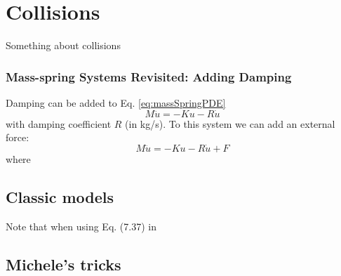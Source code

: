 \chapter{Collisions}\label{ch:collisions}
Something about collisions

\subsection{Mass-spring Systems Revisited: Adding Damping}

Damping can be added to Eq. \eqref{eq:massSpringPDE}  
\begin{equation}
    M\ddot u = -Ku - R\dot u
\end{equation}
with damping coefficient $R$ (in kg/s). To this system we can add an external force:
\begin{equation}
    M\ddot u = -Ku - R\dot u + F
\end{equation}
where 


\section{Classic models}
Note that when using Eq. (7.37) in \cite{theBible}
\section{Michele's tricks}